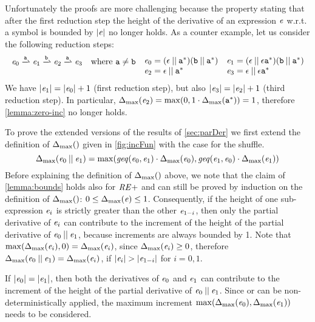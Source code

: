 Unfortunately the proofs are more challenging because the property stating that after the first reduction step the height of the derivative of an expression $\mathit {e}$ w.r.t. a symbol is bounded by ${\mid}{\mathit {e}}{\mid}$ no longer holds.
As a counter example, let us consider the following reduction steps:
\[
 \begin{array}{ll}
  \re_0\parDer{\sym}\re_1\parDer{\asym}\re_2\parDer{\sym}\re_3 & \mbox{where }\sym\neq\asym
 \end{array}
 \begin{array}[t]{ll}
  \re_0=(\eps\shuffleop\starop{\sym})\catop(\asym\shuffleop\starop{\sym}) &
  \re_1=(\eps\shuffleop\eps\catop\starop{\sym})\catop(\asym\shuffleop\starop{\sym})                                     \\
  \re_2=\eps\shuffleop\starop{\sym}                                       & \re_3=\eps\shuffleop\eps\catop\starop{\sym}
 \end{array}
\]
We have ${\mid}{\mathit {e}_1}{\mid}={\mid}{\mathit {e}_0}{\mid}+1$ (first reduction step), but also ${\mid}{\mathit {e}_3}{\mid}={\mid}{\mathit {e}_2}{\mid}+1$ (third reduction step). In particular, ${\Delta_{\max}}({\mathit {e}_2})=
 \max(0,1\cdot{\Delta_{\max}}({{\mathtt {a}}^*}))=1$, therefore \cref{lemma:zero-inc} no longer holds.

To prove the extended versions of the results of \cref{sec:parDer} we first extend the definition of ${\Delta_{\max}}({})$ given in \cref{fig:incFun} with the case for the shuffle.
\[
 {\Delta_{\max}}({\mathit {e}_0\mathbin{||}\mathit {e}_1})=\max(\mathit{geq}({\mathit {e}_0},{\mathit {e}_1})\cdot{\Delta_{\max}}({\mathit {e}_0}),\mathit{geq}({\mathit {e}_1},{\mathit {e}_0})\cdot{\Delta_{\max}}({\mathit {e}_1}))
\]
Before explaining the definition of ${\Delta_{\max}}({})$ above, we note that the claim of \cref{lemma:bounds} holds also for $\mathit {RE+}$ and can still be proved by induction on the definition of ${\Delta_{\max}}({})$: $0\leq{\Delta_{\max}}({\mathit {e}})\leq 1$.
Consequently, if the height of one sub-expression $\mathit {e}_i$ is strictly greater than the other $\mathit {e}_{1-i}$, then only the partial derivative of $\mathit {e}_i$ can contribute to the increment of the height of the partial derivative of $\mathit {e}_0\mathbin{||}\mathit {e}_1$, because increments are always bounded by 1.
Note that $\max({\Delta_{\max}}({\mathit {e}_i}),0)={\Delta_{\max}}({\mathit {e}_i})$, since ${\Delta_{\max}}({\mathit {e}_i})\geq 0$, therefore ${\Delta_{\max}}({\mathit {e}_0\mathbin{||}\mathit {e}_1})={\Delta_{\max}}({\mathit {e}_i})$, if ${\mid}{\mathit {e}_i}{\mid}>{\mid}{\mathit {e}_{1-i}}{\mid}$ for $i=0,1$.

If ${\mid}{\mathit {e}_0}{\mid}={\mid}{\mathit {e}_1}{\mid}$, then both the derivatives of $\mathit {e}_0$ and $\mathit {e}_1$ can contribute to the increment of the height of the partial derivative of $\mathit {e}_0\mathbin{||}\mathit {e}_1$.
Since  or  can be non-deterministically applied, the maximum increment
$\max({\Delta_{\max}}({\mathit {e}_0}),{\Delta_{\max}}({\mathit {e}_1}))$ needs to be considered.

